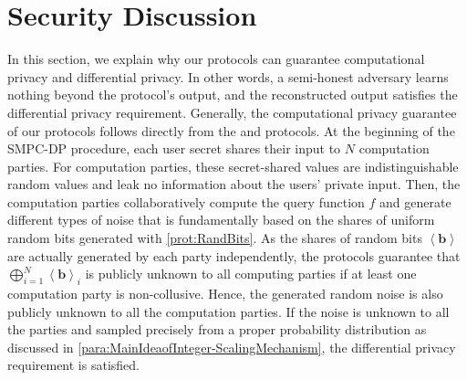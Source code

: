       \section{Security Discussion}
      \label{SecurityDiscussion}

      In this section, we explain why our \smpc protocols can guarantee computational privacy and differential privacy. In other words, a semi-honest adversary learns nothing beyond the protocol's output, and the reconstructed output satisfies the differential privacy requirement. Generally, the computational privacy guarantee of our \smpc protocols follows directly from the \booleanGMW and \arithmeticGMW protocols. At the beginning of the SMPC-DP procedure, each user secret shares their input to $ N$ computation parties. For computation parties, these secret-shared values are indistinguishable random values and leak no information about the users' private input.
      Then, the computation parties collaboratively compute the query function $f$ and generate different types of noise that is fundamentally based on the shares of uniform random bits generated with \autoref{prot:RandBits}. As the shares of random bits $\left\langle \boldsymbol{b}\right\rangle$ are actually generated by each party independently, the \booleanGMW protocols guarantee that $\bigoplus _{i=1}^{N}\left\langle \boldsymbol{b}\right\rangle_i $ is publicly unknown to all computing parties if at least one computation party is non-collusive. Hence, the generated random noise is also publicly unknown to all the computation parties. If the noise is unknown to all the parties and sampled precisely from a proper probability distribution as discussed in \autoref{para:MainIdeaofInteger-ScalingMechanism}, the differential privacy requirement is satisfied.




